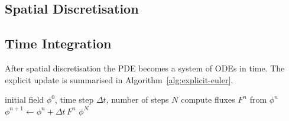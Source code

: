 \subsection{Spatial Discretisation}

\lipsum[10]

\subsection{Time Integration}

After spatial discretisation the \ac{PDE} becomes a system of \ac{ODE}s in time. The explicit update is summarised in Algorithm~\ref{alg:explicit-euler}. \lipsum[11]

\begin{algorithm}[ht!]
\caption{Explicit Euler time stepping for Equation~\eqref{eq:transport}.}
\label{alg:explicit-euler}
\begin{algorithmic}[1]
\Require initial field $\phi^0$, time step $\Delta t$, number of steps $N$
    \State compute fluxes $F^n$ from $\phi^n$
    \State $\phi^{n+1} \gets \phi^n + \Delta t \, F^n$
\EndFor
\Ensure $\phi^N$
\end{algorithmic}
\end{algorithm}
